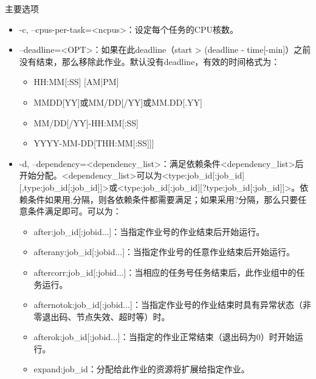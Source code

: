 \begin{frame}{主要选项}
\begin{itemize}



    \item -c, --cpus-per-task=<ncpus>：设定每个任务的CPU核数。
    \item  --deadline=<OPT>：如果在此deadline（start > (deadline - time[-min]）之前没有结束，那么移除此作业。默认没有deadline，有效的时间格式为：
\begin{itemize}
	\item HH:MM[:SS] [AM|PM]
    \item MMDD[YY]或MM/DD[/YY]或MM.DD[.YY]
    \item MM/DD[/YY]-HH:MM[:SS]
    \item YYYY-MM-DD[THH:MM[:SS]]]
\end{itemize}
    \item -d, --dependency=<dependency\_list>：满足依赖条件<dependency\_list>后开始分配。<dependency\_list>可以为<type:job\_id[:job\_id][,type:job\_id[:job\_id]]>或<type:job\_id[:job\_id][?type:job\_id[:job\_id]]>。依赖条件如果用,分隔，则各依赖条件都需要满足；如果采用?分隔，那么只要任意条件满足即可。可以为：
\begin{itemize}
	\item after:job\_id[:jobid...]：当指定作业号的作业结束后开始运行。
    \item afterany:job\_id[:jobid...]：当指定作业号的任意作业结束后开始运行。
    \item aftercorr:job\_id[:jobid...]：当相应的任务号任务结束后，此作业组中的任务运行。
    \item afternotok:job\_id[:jobid...]：当指定作业号的作业结束时具有异常状态（非零退出码、节点失效、超时等）时。
    \item afterok:job\_id[:jobid...]：当指定的作业正常结束（退出码为0）时开始运行。
    \item expand:job\_id：分配给此作业的资源将扩展给指定作业。

\end{itemize}
\end{itemize}
\end{frame}

